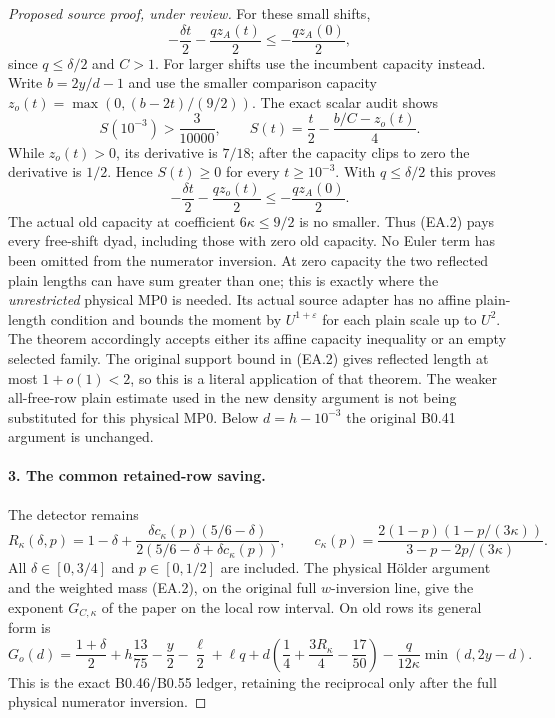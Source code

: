 \begin{proof}[Proposed source proof, under review]
For these small shifts,
\[
 -\frac{\delta t}{2}-\frac{qz_A(t)}2
 \le-\frac{qz_A(0)}2,
\]
since $q\le\delta/2$ and $C>1$. For larger shifts use the incumbent
capacity instead. Write $b=2y/d-1$ and use the smaller comparison
capacity $z_o(t)=\max(0,(b-2t)/(9/2))$. The exact scalar audit shows
\[
 S(10^{-3})>\frac3{10000},\qquad
 S(t)=\frac t2-\frac{b/C-z_o(t)}4.
\]
While $z_o(t)>0$, its derivative is $7/18$; after the capacity clips
to zero the derivative is $1/2$. Hence $S(t)\ge0$ for every
$t\ge10^{-3}$. With $q\le\delta/2$ this proves
\[
 -\frac{\delta t}{2}-\frac{qz_o(t)}2
 \le-\frac{qz_A(0)}2.                                \tag{EA.4}
\]
The actual old capacity at coefficient $6\kappa\le9/2$ is no smaller.
Thus (EA.2) pays every free-shift dyad, including those with zero old
capacity. No Euler term has been omitted from the numerator inversion.
At zero capacity the two reflected plain lengths can have sum greater
than one; this is exactly where the \emph{unrestricted} physical MP0 is
needed. Its actual source adapter
 has no affine
plain-length condition and bounds the moment by $U^{1+\varepsilon}$
for each plain scale up to $U^2$. The theorem
accordingly accepts either its affine capacity inequality or an empty
selected family. The original support bound in (EA.2) gives reflected
length at most $1+o(1)<2$, so this is a literal application of that
theorem. The weaker all-free-row plain estimate used in the new density
argument is not being substituted for this physical MP0.
Below $d=h-10^{-3}$ the original B0.41 argument is unchanged.

\paragraph{3. The common retained-row saving.}
The detector remains
\[
 R_\kappa(\delta,p)=1-\delta+
 \frac{\delta c_\kappa(p)(5/6-\delta)}
      {2(5/6-\delta+\delta c_\kappa(p))},\qquad
 c_\kappa(p)=\frac{2(1-p)(1-p/(3\kappa))}
                   {3-p-2p/(3\kappa)}.
\]
All $\delta\in[0,3/4]$ and $p\in[0,1/2]$ are included. The physical
H\"older argument and the weighted mass (EA.2), on the original full
$w$-inversion line, give the exponent $G_{C,\kappa}$ of the paper on
the local row interval. On old rows its general form is
\[
 G_o(d)=\frac{1+\delta}{2}+h\frac{13}{75}
 -\frac y2-\frac\ell2+\ell q
 +d\left(\frac14+\frac{3R_\kappa}4-\frac{17}{50}\right)
 -\frac{q}{12\kappa}\min(d,2y-d).                    \tag{EA.5}
\]
This is the exact B0.46/B0.55 ledger, retaining the reciprocal only
after the full physical numerator inversion.


\end{proof}
